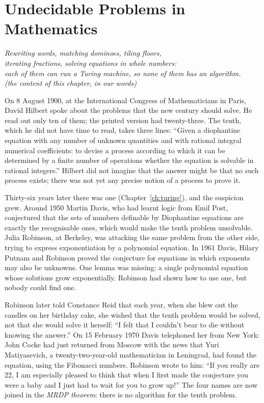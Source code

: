 \chapter{Undecidable Problems in Mathematics}\label{ch:undecidable}

\begin{center}\itshape
Rewriting words, matching dominoes, tiling floors,\\
iterating fractions, solving equations in whole numbers:\\
each of them can run a Turing machine, so none of them has an algorithm.\\
\upshape(the content of this chapter, in our words)
\end{center}

On 8 August 1900, at the International Congress of Mathematicians in Paris, David Hilbert spoke about the problems that the new century should solve. He read out only ten of them; the printed version had twenty-three. The tenth, which he did not have time to read, takes three lines: ``Given a diophantine equation with any number of unknown quantities and with rational integral numerical coefficients: to devise a process according to which it can be determined by a finite number of operations whether the equation is solvable in rational integers.'' Hilbert did not imagine that the answer might be that no such process exists; there was not yet any precise notion of a process to prove it.

Thirty-six years later there was one (Chapter~\ref{ch:turing}), and the suspicion grew. Around 1950 Martin Davis, who had learnt logic from Emil Post, conjectured that the sets of numbers definable by Diophantine equations are exactly the recognisable ones, which would make the tenth problem unsolvable. Julia Robinson, at Berkeley, was attacking the same problem from the other side, trying to express exponentiation by a polynomial equation. In 1961 Davis, Hilary Putnam and Robinson proved the conjecture for equations in which exponents may also be unknowns. One lemma was missing: a single polynomial equation whose solutions grow exponentially. Robinson had shown how to use one, but nobody could find one.

Robinson later told Constance Reid that each year, when she blew out the candles on her birthday cake, she wished that the tenth problem would be solved, not that she would solve it herself: ``I felt that I couldn't bear to die without knowing the answer.'' On 15 February 1970 Davis telephoned her from New York: John Cocke had just returned from Moscow with the news that Yuri Matiyasevich, a twenty-two-year-old mathematician in Leningrad, had found the equation, using the Fibonacci numbers. Robinson wrote to him: ``If you really are 22, I am especially pleased to think that when I first made the conjecture you were a baby and I just had to wait for you to grow up!'' The four names are now joined in the \emph{MRDP theorem}: there is no algorithm for the tenth problem.

